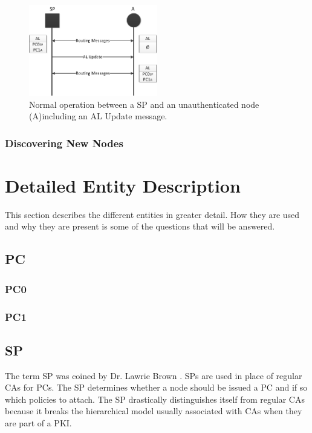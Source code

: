 \begin{figure}[h]
	\centering
  	\includegraphics[width=0.5\textwidth]{images/node_states_authorized.png}
  	\caption{Normal operation between a \acf{SP} and an unauthenticated node
  	(A)including an \ac{AL} Update message.}
	\label{fig:node_states_authorized}
\end{figure}



\subsubsection*{Discovering New Nodes}


\section{Detailed Entity Description}
This section describes the different entities in greater detail. How they are
used and why they are present is some of the questions that will be answered.

\subsection{\acf{PC}}


\subsubsection*{\acf{PC0}}

\subsubsection*{\acf{PC1}}

\subsection{\acf{SP}}
The term \acl{SP} was coined by Dr. Lawrie Brown \cite{lawrie:technotes}.
\acp{SP} are used in place of regular \acp{CA} for \acp{PC}. The \ac{SP}
determines whether a node should be issued a \ac{PC} and if so which policies to
attach. The \ac{SP} drastically distinguishes itself from regular \acp{CA}
because it breaks the hierarchical model usually associated with \acp{CA} when
they are part of a \ac{PKI}.

